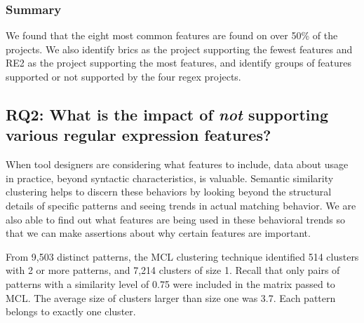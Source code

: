 \subsubsection{Summary}
We found that the eight most common features are found on over 50\% of the projects.
We also identify brics as the project supporting the fewest features and RE2 as the project supporting the most features, and identify groups of features supported or not supported by the four regex projects.


\subsection{{RQ2:} What is the impact of \emph{not} supporting various regular expression features?}
\label{results:rq3}

When tool designers are considering what features to include, data about usage in practice, beyond syntactic characteristics, is valuable.  Semantic similarity clustering  helps to discern these behaviors by looking beyond the structural details of specific patterns and seeing trends in actual matching behavior.  We are also able to find out what features are being used in these behavioral trends so that we can make assertions about why certain features are important.

From 9,503 distinct patterns, the MCL clustering technique identified 514 clusters with 2 or more patterns, and 7,214 clusters of size 1.  Recall that only pairs of patterns with a similarity level of 0.75 were included in the matrix passed to MCL.  The average size of clusters larger than size one was 3.7.
Each pattern belongs to exactly one cluster.


